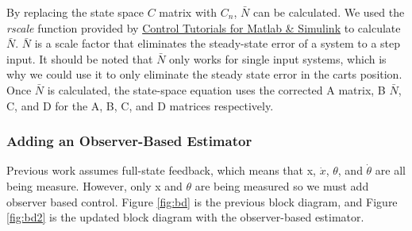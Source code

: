 \documentclass{article}
\begin{document}
By replacing the state space $C$ matrix with $C_n$, $\bar{N}$ can be calculated. We used the \textit{rscale} function provided by \href{http://ctms.engin.umich.edu/CTMS/index.php?aux=Extras_rscale}{Control Tutorials for Matlab \& Simulink} to calculate $\bar{N}$. $\bar{N}$ is a scale factor that eliminates the steady-state error of a system to a step input. It should be noted that $\bar{N}$ only works for single input systems, which is why we could use it to only eliminate the steady state error in the carts position. Once $\bar{N}$ is calculated, the state-space equation uses the corrected A matrix, B $\bar{N}$, C, and D for the A, B, C, and D matrices respectively.
 
 \subsubsection{Adding an Observer-Based Estimator}
 Previous work assumes full-state feedback, which means that x, $\dot{x}$, $\theta$, and $\dot{\theta}$ are all being measure. However, only x and $\theta$ are being measured so we must add observer based control. Figure \ref{fig:bd} is the previous block diagram, and Figure \ref{fig:bd2} is the updated block diagram with the observer-based estimator.
\end{document}
